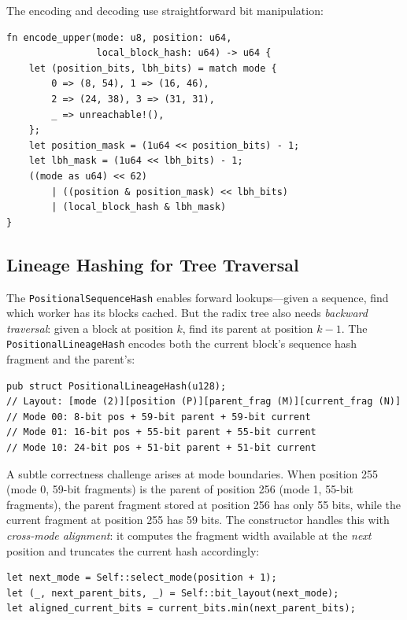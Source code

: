 The encoding and decoding use straightforward bit manipulation:

\begin{verbatim}
fn encode_upper(mode: u8, position: u64,
                local_block_hash: u64) -> u64 {
    let (position_bits, lbh_bits) = match mode {
        0 => (8, 54), 1 => (16, 46),
        2 => (24, 38), 3 => (31, 31),
        _ => unreachable!(),
    };
    let position_mask = (1u64 << position_bits) - 1;
    let lbh_mask = (1u64 << lbh_bits) - 1;
    ((mode as u64) << 62)
        | ((position & position_mask) << lbh_bits)
        | (local_block_hash & lbh_mask)
}
\end{verbatim}

\subsection{Lineage Hashing for Tree Traversal}

The \texttt{PositionalSequenceHash} enables forward lookups---given a sequence, find which worker has its blocks cached. But the radix tree also needs \emph{backward traversal}: given a block at position $k$, find its parent at position $k - 1$. The \texttt{PositionalLineageHash} encodes both the current block's sequence hash fragment and the parent's:

\begin{verbatim}
pub struct PositionalLineageHash(u128);
// Layout: [mode (2)][position (P)][parent_frag (M)][current_frag (N)]
// Mode 00: 8-bit pos + 59-bit parent + 59-bit current
// Mode 01: 16-bit pos + 55-bit parent + 55-bit current
// Mode 10: 24-bit pos + 51-bit parent + 51-bit current
\end{verbatim}

A subtle correctness challenge arises at mode boundaries. When position 255 (mode 0, 59-bit fragments) is the parent of position 256 (mode 1, 55-bit fragments), the parent fragment stored at position 256 has only 55 bits, while the current fragment at position 255 has 59 bits. The constructor handles this with \emph{cross-mode alignment}: it computes the fragment width available at the \emph{next} position and truncates the current hash accordingly:

\begin{verbatim}
let next_mode = Self::select_mode(position + 1);
let (_, next_parent_bits, _) = Self::bit_layout(next_mode);
let aligned_current_bits = current_bits.min(next_parent_bits);
\end{verbatim}

